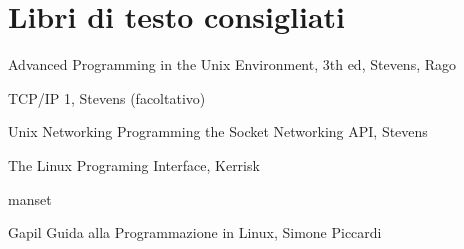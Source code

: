 
\section{Libri di testo consigliati}
\itemize{}
	\item Advanced Programming in the Unix Environment, 3th ed, Stevens, Rago
	\item TCP/IP 1, Stevens (facoltativo)
	\item Unix Networking Programming the Socket Networking API, Stevens
	\item The Linux Programing Interface, Kerrisk
	\item manset
	\item Gapil Guida alla Programmazione in Linux, Simone Piccardi